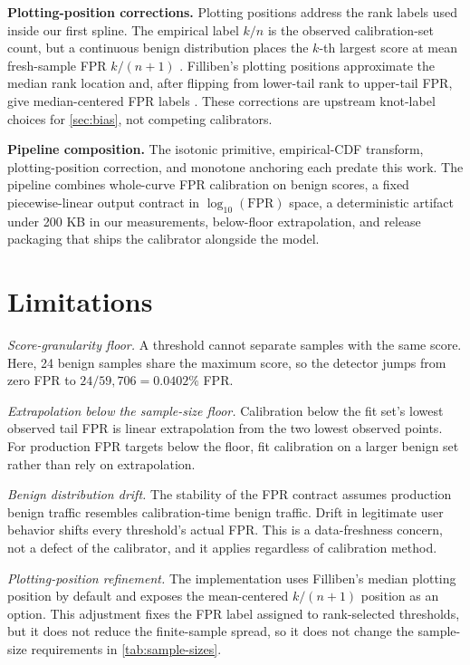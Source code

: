 \documentclass{article}
\begin{document}
\textbf{Plotting-position corrections.}
Plotting positions address the rank labels used inside our first spline.
The empirical label $k/n$ is the observed calibration-set count, but a continuous benign distribution places the $k$-th largest score at mean fresh-sample FPR $k/(n+1)$ \citep{nistOrderStatisticMeans}.
Filliben's plotting positions approximate the median rank location and, after flipping from lower-tail rank to upper-tail FPR, give median-centered FPR labels \citep{filliben1975,nistProbabilityPlot}.
These corrections are upstream knot-label choices for \cref{sec:bias}, not competing calibrators.

\textbf{Pipeline composition.}
The isotonic primitive, empirical-CDF transform, plotting-position correction, and monotone anchoring each predate this work.
The pipeline combines whole-curve FPR calibration on benign scores, a fixed piecewise-linear output contract in $\log_{10}(\mathrm{FPR})$ space, a deterministic artifact under 200 KB in our measurements, below-floor extrapolation, and release packaging that ships the calibrator alongside the model.

\section{Limitations}
\label{sec:limitations}

\emph{Score-granularity floor.}
A threshold cannot separate samples with the same score.
Here, 24 benign samples share the maximum score, so the detector jumps from zero FPR to $24/59{,}706 = 0.0402\%$ FPR.

\emph{Extrapolation below the sample-size floor.}
Calibration below the fit set's lowest observed tail FPR is linear extrapolation from the two lowest observed points.
For production FPR targets below the floor, fit calibration on a larger benign set rather than rely on extrapolation.

\emph{Benign distribution drift.}
The stability of the FPR contract assumes production benign traffic resembles calibration-time benign traffic.
Drift in legitimate user behavior shifts every threshold's actual FPR.
This is a data-freshness concern, not a defect of the calibrator, and it applies regardless of calibration method.

\emph{Plotting-position refinement.}
The implementation uses Filliben's median plotting position \citep{filliben1975} by default and exposes the mean-centered $k/(n+1)$ position as an option.
This adjustment fixes the FPR label assigned to rank-selected thresholds, but it does not reduce the finite-sample spread, so it does not change the sample-size requirements in \cref{tab:sample-sizes}.
\end{document}
